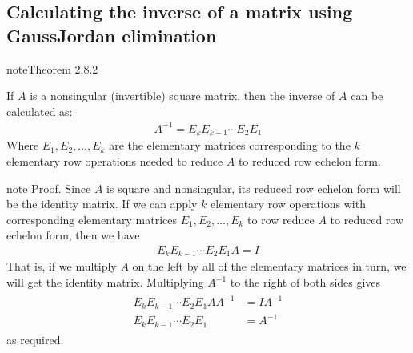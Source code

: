 \documentclass[letterpaper,10pt,english]{jupyterBook}
\begin{document}
\subsection{Calculating the inverse of a matrix using Gauss\sphinxhyphen{}Jordan elimination}
\label{\detokenize{_pages/2.5_Gauss_Jordan_elimination:calculating-the-inverse-of-a-matrix-using-gauss-jordan-elimination}}
\ignorespaces \label{_pages/2.5_Gauss_Jordan_elimination:theorem-5}
\begin{sphinxadmonition}{note}{Theorem 2.8.2}



\sphinxAtStartPar
If \(A\) is a non\sphinxhyphen{}singular (invertible) square matrix, then the inverse of \(A\) can be calculated as:
\begin{equation*}
\begin{split}A^{-1} = E_kE_{k-1}\cdots E_2E_1\end{split}
\end{equation*}
\sphinxAtStartPar
Where \(E_1, E_2, \ldots, E_k\) are the elementary matrices corresponding to the \(k\) elementary row operations needed to reduce \(A\) to reduced row echelon form.
\end{sphinxadmonition}

\begin{sphinxadmonition}{note}
\sphinxAtStartPar
Proof. Since \(A\) is square and non\sphinxhyphen{}singular, its reduced row echelon form will be the identity matrix. If we can apply \(k\) elementary row operations with corresponding elementary matrices \(E_1, E_2, \ldots, E_k\) to row reduce \(A\) to reduced row echelon form, then we have
\begin{equation*}
\begin{split}E_k E_{k-1} \cdots E_2 E_1 A = I\end{split}
\end{equation*}
\sphinxAtStartPar
That is, if we multiply \(A\) on the left by all of the elementary matrices in turn, we will get the identity matrix.  Multiplying \(A^{-1}\) to the right of both sides gives
\begin{equation*}
\begin{split} \begin{align*}
 E_k E_{k-1} \cdots E_2 E_1 A A^{-1} &= I A^{-1} \\
 E_k E_{k-1} \cdots E_2 E_1 &= A^{-1}
\end{align*} \end{split}
\end{equation*}
\sphinxAtStartPar
as required.
\end{sphinxadmonition}
\end{document}
